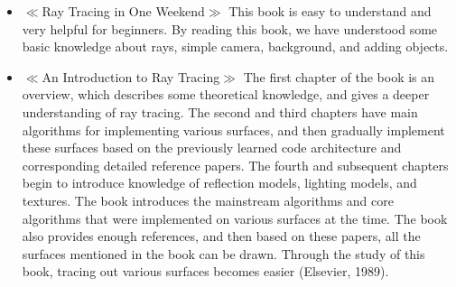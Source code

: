 \documentclass[11pt]{article}
\begin{document}
\begin{itemize}
\item 
$\ll$Ray Tracing in One Weekend$\gg$ 
This book is easy to understand and very helpful for beginners. By reading this book, we have understood some basic knowledge about rays, simple camera, background, and adding objects.
\item
$\ll$An Introduction to Ray Tracing$\gg$
The first chapter of the book is an overview, which describes some theoretical knowledge, and gives a deeper understanding of ray tracing. The second and third chapters have main algorithms for implementing various surfaces, and then gradually implement these surfaces based on the previously learned code architecture and corresponding detailed reference papers. The fourth and subsequent chapters begin to introduce knowledge of reflection models, lighting models, and textures. The book introduces the mainstream algorithms and core algorithms that were implemented on various surfaces at the time. The book also provides enough references, and then based on these papers, all the surfaces mentioned in the book can be drawn. Through the study of this book, tracing out various surfaces becomes easier (Elsevier, 1989).


\end{itemize}
\end{document}
